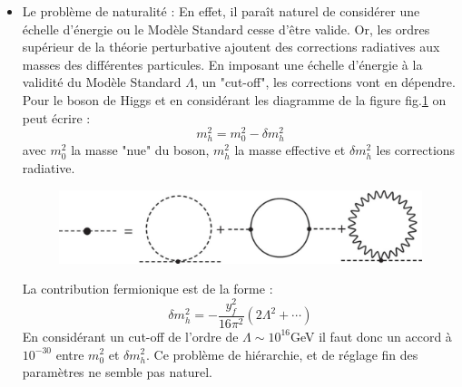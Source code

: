 \begin{itemize}[label=$\bullet$]
\item Le problème de naturalité : En effet, il paraît naturel de considérer une échelle d'énergie ou le Modèle Standard cesse d'être valide. Or, les ordres supérieur de la théorie perturbative ajoutent des corrections radiatives aux masses des différentes particules. En imposant une échelle d'énergie à la validité du Modèle Standard $\Lambda$, un "cut-off", les corrections vont en dépendre. Pour le boson de Higgs et en considérant les diagramme de la figure fig.\cref{corrections} on peut écrire :
\begin{equation}
m_{h}^{2}=m_{0}^{2}-\delta m_{h}^{2}
\end{equation}
avec $m_{0}^{2}$ la masse "nue" du boson, $m_{h}^{2}$ la masse effective et $\delta m_{h}^{2}$ les corrections radiative.
\begin{figure}[h!]
\centering
\includegraphics[width=1\textwidth]{SM/corrections.jpg}
\label{corrections}
\end{figure}
La contribution fermionique est de la forme :
\begin{equation}
\delta m_{h}^{2}=-\frac{y_{f}^{2}}{16\pi^{2}}\left(2\Lambda^{2}+\cdots\right)
\end{equation}
En considérant un cut-off de l'ordre de $\Lambda \sim 10^{16}$GeV il faut donc un accord à $10^{-30}$ entre $m_{0}^{2}$ et $\delta m_{h}^{2}$. Ce problème de hiérarchie, et de réglage fin des paramètres ne semble pas naturel.


\end{itemize}
